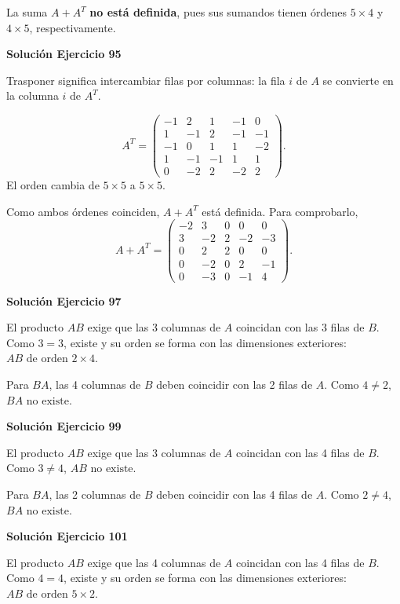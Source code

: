\documentclass[12pt]{article}
\begin{document}
La suma $A+A^T$ \textbf{no está definida}, pues sus sumandos tienen órdenes $5\times4$ y $4\times5$, respectivamente.


\par\bigskip\noindent\textbf{Solución Ejercicio 95}\par\nobreak
Trasponer significa intercambiar filas por columnas: la fila $i$ de $A$ se convierte en la columna $i$ de $A^T$.

\[
A^T=\begin{pmatrix}-1&2&1&-1&0\\1&-1&2&-1&-1\\-1&0&1&1&-2\\1&-1&-1&1&1\\0&-2&2&-2&2\end{pmatrix}.
\]
El orden cambia de $5\times5$ a $5\times5$.

Como ambos órdenes coinciden, $A+A^T$ está definida. Para comprobarlo,
\[
A+A^T=\begin{pmatrix}-2&3&0&0&0\\3&-2&2&-2&-3\\0&2&2&0&0\\0&-2&0&2&-1\\0&-3&0&-1&4\end{pmatrix}.
\]

\par\bigskip\noindent\textbf{Solución Ejercicio 97}\par\nobreak
El producto $AB$ exige que las 3 columnas de $A$ coincidan con las 3 filas de $B$. Como $3=3$, existe y su orden se forma con las dimensiones exteriores: $\boxed{AB\text{ de orden } 2\times 4}$.

Para $BA$, las 4 columnas de $B$ deben coincidir con las 2 filas de $A$. Como $4\neq2$, $\boxed{BA\text{ no existe}}$.


\par\bigskip\noindent\textbf{Solución Ejercicio 99}\par\nobreak
El producto $AB$ exige que las 3 columnas de $A$ coincidan con las 4 filas de $B$. Como $3\neq4$, $\boxed{AB\text{ no existe}}$.

Para $BA$, las 2 columnas de $B$ deben coincidir con las 4 filas de $A$. Como $2\neq4$, $\boxed{BA\text{ no existe}}$.


\par\bigskip\noindent\textbf{Solución Ejercicio 101}\par\nobreak
El producto $AB$ exige que las 4 columnas de $A$ coincidan con las 4 filas de $B$. Como $4=4$, existe y su orden se forma con las dimensiones exteriores: $\boxed{AB\text{ de orden } 5\times 2}$.
\end{document}
